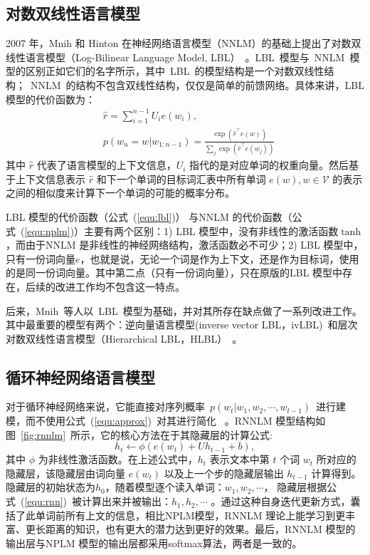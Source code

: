 \subsection{对数双线性语言模型}
2007 年，Mnih 和 Hinton 在神经网络语言模型（NNLM）的基础上提出了对数双线性语言模型（Log-Bilinear Language Model, LBL）~。LBL~模型与~NNLM~模型的区别正如它们的名字所示，其中~LBL~的模型结构是一个对数双线性结构；~NNLM~的结构不包含双线性结构，仅仅是简单的前馈网络。具体来讲，LBL 模型的代价函数为：
\begin{equation}
\label{equ:lbl}
\begin{split}
   &\hat r=\sum_{i=1}^{n-1}{U_i e({w_i})}, \\
   &p(w_n=w|w_{1:n-1})=\frac{\exp(\hat r^\top e(w))}{\sum_j{\exp(\hat r^\top e(w_j))}}
\end{split}
\end{equation}
其中 $\hat r$ 代表了语言模型的上下文信息，$U_i$ 指代的是对应单词的权重向量。然后基于上下文信息表示 $\hat r$ 和下一个单词的目标词汇表中所有单词 $e(w),w\in \mathcal{V}$ 的表示之间的相似度来计算下一个单词的可能的概率分布。

LBL 模型的代价函数（公式~(\ref{equ:lbl})） 与NNLM 的代价函数（公式~(\ref{equ:nplm})）主要有两个区别：1) LBL 模型中，没有非线性的激活函数$\tanh$，而由于NNLM 是非线性的神经网络结构，激活函数必不可少；2) LBL 模型中，只有一份词向量$e$，也就是说，无论一个词是作为上下文，还是作为目标词，使用的是同一份词向量。其中第二点（只有一份词向量），只在原版的LBL 模型中存在，后续的改进工作均不包含这一特点。

后来，Mnih~等人以~LBL~模型为基础，并对其所存在缺点做了一系列改进工作。其中最重要的模型有两个：逆向量语言模型(inverse vector LBL，ivLBL)~和层次对数双线性语言模型（Hierarchical LBL，HLBL）~。

\subsection{循环神经网络语言模型}
对于循环神经网络来说，它能直接对序列概率~$p(w_t | w_1,w_2,\cdots,w_{t-1})$~进行建模，而不使用公式~(\ref{equ:approx})~对其进行简化~ 。RNNLM 模型结构如图~\ref{fig:rnnlm}~所示，它的核心方法在于其隐藏层的计算公式:
\begin{equation}
\label{equ:rnn}
  h_t \leftarrow  \phi(e(w_t) + U h_{t-1} +b),
\end{equation}
其中 $\phi$ 为非线性激活函数。在上述公式中，$h_t$ 表示文本中第 $t$ 个词 $w_t$ 所对应的隐藏层，该隐藏层由词向量 $e(w_t)$ 以及上一个步的隐藏层输出 $h_{t -1}$ 计算得到。隐藏层的初始状态为$h_0$，随着模型逐个读入单词：$w_1,w_2,\cdots$， 隐藏层根据公式~(\ref{equ:rnn})~被计算出来并被输出：$h_1,h_2,\cdots$ 。通过这种自身迭代更新方式，囊括了此单词前所有上文的信息，相比NPLM模型，RNNLM 理论上能学习到更丰富、更长距离的知识，也有更大的潜力达到更好的效果。最后，RNNLM 模型的输出层与NPLM 模型的输出层都采用softmax算法，两者是一致的。

